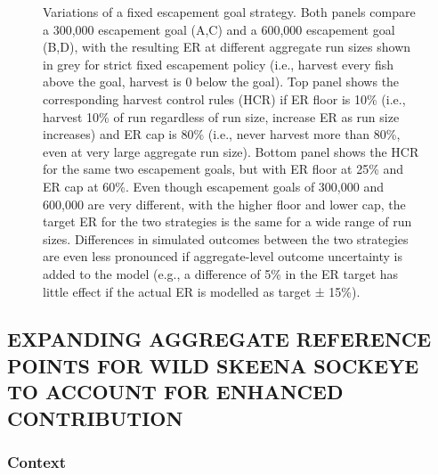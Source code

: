 \documentclass[french,11pt]{book}
\begin{document}
\begin{figure}[htb]

{\centering {} 

}

\caption{Variations of a fixed escapement goal strategy. Both panels compare a 300,000 escapement goal (A,C) and a 600,000 escapement goal (B,D), with the resulting ER at different aggregate run sizes shown in grey for strict fixed escapement policy (i.e., harvest every fish above the goal, harvest is 0 below the goal). Top panel shows the corresponding harvest control rules (HCR) if ER floor is 10\% (i.e., harvest 10\% of run regardless of run size, increase ER as run size increases) and ER cap is 80\% (i.e., never harvest more than 80\%, even at very large aggregate run size). Bottom panel shows the HCR for the same two escapement goals, but with ER floor at 25\% and ER cap at 60\%. Even though escapement goals of 300,000 and 600,000 are very different, with the higher floor and lower cap, the target ER for the two strategies is the same for a wide range of run sizes. Differences in simulated outcomes between the two strategies are even less pronounced if aggregate-level outcome uncertainty is added to the model (e.g., a difference of 5\% in the ER target has little effect if the actual ER is modelled as target ± 15\%).}\label{fig:FixedEscVar}
\end{figure}
\clearpage

\subsection{EXPANDING AGGREGATE REFERENCE POINTS FOR WILD SKEENA SOCKEYE TO ACCOUNT FOR ENHANCED CONTRIBUTION}\label{SkeenaExpResults}

\subsubsection{Context}\label{context}
\end{document}
